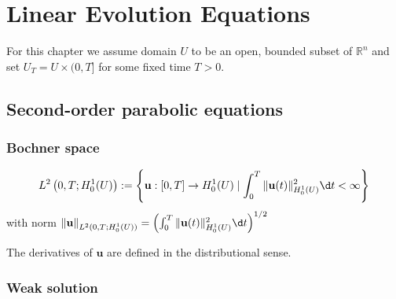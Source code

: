 \chapter{Linear Evolution Equations}

For this chapter we assume domain $U$ to be an open, bounded subset of $\mathbb{R}^n$ and set $U_T=U \times(0, T]$ for some fixed time $T>0$.

\section{Second-order parabolic equations}
\subsection{Bochner space}
\begin{definition}
    \begin{equation*}
        L^2\left(0, T ; H_0^1(U)\right)
        :=
        \left\{\mathbf{u}:[0, T] \rightarrow H_0^1(U) \mid \int_0^T\|\mathbf{u}(t)\|_{H_0^1(U)}^2 \d t<\infty\right\}
    \end{equation*}
    with norm $\left\|\mathbf{u}\right\|_{L^2(0,T;H_0^1(U))}=\left(\int_0^T\|\mathbf{u}(t)\|_{H_0^1(U)}^2 \d t\right)^{1/2}$

    The derivatives of $\mathbf{u}$ are defined in the distributional sense. 
\end{definition}


\subsection{Weak solution} %

